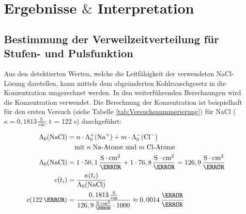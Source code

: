\documentclass[12pt,liststotoc]{report}
\begin{document}
\chapter{Ergebnisse $\&$ Interpretation}

\section{Bestimmung der Verweilzeitverteilung für Stufen- und Pulsfunktion}


   

Aus den detektierten Werten, welche die Leitfähigkeit der verwendeten NaCl-Lösung darstellen, kann mittels dem abgeänderten Kohlrauschgesetz \cite{Leitfahigkeit_Wasser} in die Konzentration umgerechnet werden. In den weiterführenden Berechnungen wird die Konzentration verwendet. Die Berechnung der Konzentration ist beispielhaft für den ersten Versuch (siehe Tabelle \ref{tab:Versuchsnummerierung}) für NaCl ($\kappa = 0,1813\,\frac{\text{S}}{\text{cm}}$; t = 122 s) durchgeführt:

\setlength{}
\begin{align}
    \Lambda_0(\text{NaCl})=&\;n\cdot\Lambda^+_0(\text{Na}^+) + m\cdot\Lambda^-_0(\text{Cl}^-)\\
    &\text{mit } n\;\text{Na-}\text{Atome } \text{und } m\; \text{Cl-}\text{Atome}\notag\\
    \Lambda_0(\text{NaCl})=&\;1\cdot50,1\,\frac{\text{S}\cdot\text{cm}^2}{\mole} + 1\cdot76,8\,\frac{\text{S}\cdot\text{cm}^2}{\mole} = 126,9\,\frac{\text{S}\cdot\text{cm}^2}{\mole}\notag\\
    c (t_i) = &\;\frac{\kappa(t_i)}{\Lambda_0(\text{NaCl})}\\
    c (122\,\s) = &\; \frac{0,1813\,\frac{\text{S}}{\text{cm}}}{126,9\,\frac{\text{S}\cdot\text{cm}^2}{\mole}\cdot1000} \approx 0,0014\,\frac{\mole}{\litre}\notag
\end{align}
\end{document}
